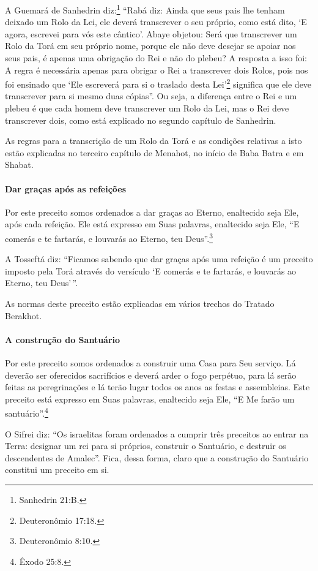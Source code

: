 A Guemará de Sanhedrin diz:\footnote{Sanhedrin 21:B.} ``Rabá diz: Ainda que
seus pais lhe tenham deixado um Rolo da Lei, ele deverá transcrever o seu próprio,
como está dito, `E agora, escrevei para vós este cântico'. Abaye
objetou: Será que transcrever um Rolo da Torá em seu próprio nome,
porque ele não deve desejar se apoiar nos seus pais, é apenas uma
obrigação do Rei e não do plebeu? A resposta a isso foi: A regra é
necessária apenas para obrigar o Rei a transcrever dois Rolos, pois nos
foi ensinado que `Ele escreverá para si o traslado desta Lei'\footnote{Deuteronômio 17:18.} significa que ele deve transcrever para si mesmo
duas cópias''. Ou seja, a diferença entre o Rei e um plebeu é que cada
homem deve transcrever um Rolo da Lei, mas o Rei deve transcrever dois,
como está explicado no segundo capítulo de Sanhedrin.

As regras para a transcrição de um Rolo da Torá e as condições
relativas a isto estão explicadas no terceiro capítulo de Menahot, no
início de Baba Batra e em Shabat.

\paragraph{Dar graças após as refeições}

Por este preceito somos ordenados a dar graças ao Eterno, enaltecido
seja Ele, após cada refeição. Ele está expresso em Suas palavras,
enaltecido seja Ele, ``E comerás e te fartarás, e louvarás ao Eterno,
teu Deus''.\footnote{Deuteronômio 8:10.}

A Tosseftá diz: ``Ficamos sabendo que dar graças após uma refeição é um
preceito imposto pela Torá através do versículo `E comerás e te
fartarás, e louvarás ao Eterno, teu Deus'\,''.

As normas deste preceito estão explicadas em vários trechos do Tratado
Berakhot.

\paragraph{A construção do Santuário}

Por este preceito somos ordenados a construir uma Casa para Seu serviço.
Lá deverão ser oferecidos sacrifícios e deverá arder o fogo perpétuo,
para lá serão feitas as peregrinações e lá terão lugar todos os anos as
festas e assembleias. Este preceito está expresso em Suas palavras,
enaltecido seja Ele, ``E Me farão um santuário''.\footnote{Êxodo 25:8.}

O Sifrei diz: ``Os israelitas foram ordenados a cumprir três preceitos
ao entrar na Terra: designar um rei para si próprios, construir o
Santuário, e destruir os descendentes de Amalec''. Fica, dessa forma,
claro que a construção do Santuário constitui um preceito em si.

